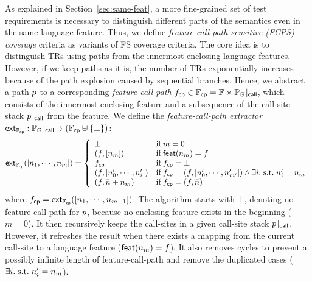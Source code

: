 As explained in Section~\ref{sec:same-feat}, a more fine-grained set of test
requirements is necessary to distinguish different parts of the semantics even
in the same language feature.
Thus, we define \textit{feature-call-path-sensitive (FCPS)
coverage} criteria as variants of FS coverage criteria.
%
The core idea is to distinguish TRs using paths from the innermost enclosing language
features.
%
However, if we keep paths as it is, the number of TRs exponentially increases
because of the path explosion caused by sequential branches.
%
Hence, we abstract a path $p$ to a corresponding \textit{feature-call-path}
$f_{\textsf{cp}} \in \mathbb{F}_{\textsf{cp}} = \mathbb{F} \times {\mathbb{P}_{\mathbb{G}}}\!\mid_{\textsf{call}}$, which consists of
the innermost enclosing feature and a subsequence of the call-site stack ${p}\!\mid_{\textsf{call}}$
from the feature.
%
We define the \textit{feature-call-path extractor} $\textsf{ext}_{\mathbb{F}_{\textsf{cp}}}:
{\mathbb{P}_{\mathbb{G}}}\!\mid_{\textsf{call}} \rightarrow (\mathbb{F}_{\textsf{cp}} \uplus \{ \bot \})$:
%
\begin{equation}\label{equ:extfcp}
  \textsf{ext}_{\mathbb{F}_{\textsf{cp}}}([n_1, \cdots, n_m]) = \left\{
    \begin{array}{ll}
      \bot & \text{if} \; m = 0\\

      (f, [n_m]) & \text{if} \; \textsf{feat}(n_m) = f\\

      f_{\textsf{cp}} & \text{if} \; f_{\textsf{cp}} = \bot\\

      (f, [n'_0, \cdots, n'_i]) &
      \text{if} \; f_{\textsf{cp}} = (f, [n'_0, \cdots, n'_{m'}]) \wedge
      \exists i. {\; \text{s.t.} \; } n'_i = n_m\\

      (f, \bar{n} + n_m) & \text{if} \; f_{\textsf{cp}} = (f, \bar{n})\\
    \end{array}
  \right.
\end{equation}
%
where $f_{\textsf{cp}} = \textsf{ext}_{\mathbb{F}_{\textsf{cp}}}([n_1, \cdots, n_{m-1}])$.
%
The algorithm starts with $\bot$, denoting no feature-call-path
for $p$, because no enclosing feature exists in the beginning ($m = 0$).
%
It then recursively keeps the call-sites in a given call-site
stack ${p}\!\mid_{\textsf{call}}$.
%
However, it refreshes the result when there exists a mapping from the current
call-site to a language feature ($\textsf{feat}(n_m) = f$).
%
It also removes cycles to prevent a possibly infinite
length of feature-call-path and remove the duplicated cases ($\exists i. {\; \text{s.t.} \; }
n'_i = n_m$).



